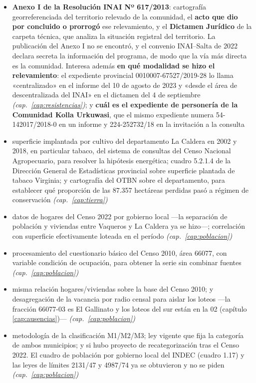 \begin{itemize}[leftmargin=*]
\item \textbf{Anexo I de la Resolución INAI Nº 617/2013}: cartografía georreferenciada del territorio relevado de la comunidad, el \textbf{acto que dio por concluido o prorrogó} ese relevamiento, y el \textbf{Dictamen Jurídico} de la carpeta técnica, que analiza la situación registral del territorio. La publicación del Anexo I no se encontró, y el convenio INAI--Salta de 2022 declara secreta la información del programa, de modo que la vía más directa es la comunidad. Interesa además \textbf{en qué modalidad se hizo el relevamiento}: el expediente provincial 0010007-67527/2019-28 lo llama «centralizado» en el informe del 10 de agosto de 2023 y «desde el área de descentralizada del INAI» en el dictamen del 4 de septiembre \textit{(cap.\ \ref{cap:resistencias})}; y \textbf{cuál es el expediente de personería de la Comunidad Kolla Urkuwasi}, que el mismo expediente numera 54-142017/2018-0 en un informe y 224-252732/18 en la invitación a la consulta
\item superficie implantada por cultivo del departamento La Caldera en 2002 y 2018, en particular tabaco, del sistema de consultas del Censo Nacional Agropecuario, para resolver la hipótesis energética; cuadro 5.2.1.4 de la Dirección General de Estadísticas provincial sobre superficie plantada de tabaco Virginia; y cartografía del OTBN sobre el departamento, para establecer qué proporción de las 87.357 hectáreas perdidas pasó a régimen de conservación \textit{(cap.\ \ref{cap:tierra})}
\item datos de hogares del Censo 2022 por gobierno local ---la separación de población y viviendas entre Vaqueros y La Caldera ya se hizo---; correlación con superficie efectivamente loteada en el período \textit{(cap.\ \ref{cap:poblacion})}
\item procesamiento del cuestionario básico del Censo 2010, área 66077, con variable condición de ocupación, para obtener la serie sin combinar fuentes \textit{(cap.\ \ref{cap:poblacion})}
\item misma relación hogares/viviendas sobre la base del Censo 2010; y desagregación de la vacancia por radio censal para aislar los loteos ---la fracción 66077-03 es El Gallinato y los loteos del sur están en la 02 (capítulo \ref{cap:ausencias})--- \textit{(cap.\ \ref{cap:poblacion})}
\item metodología de la clasificación M1/M2/M3; ley vigente que fija la categoría de ambos municipios; y si hubo proyecto de recategorización tras el Censo 2022. El cuadro de población por gobierno local del INDEC (cuadro 1.17) y las leyes de límites 2131/47 y 4987/74 ya se obtuvieron y no se piden \textit{(cap.\ \ref{cap:poblacion})}

\end{itemize}
